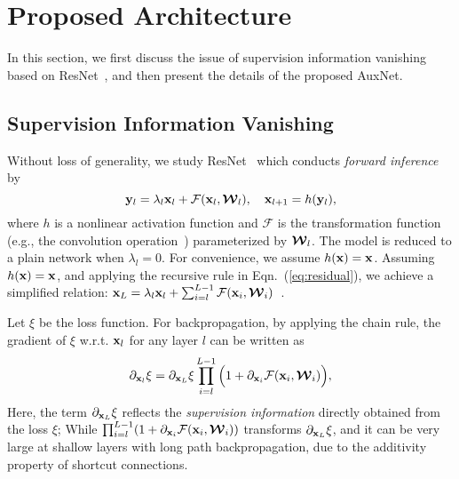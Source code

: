 \documentclass[10pt,onecolumn,letterpaper]{article}
\def\mF{{\mathcal F}}
\def\bmW{\mbox{\boldmath${\mathcal W}$}}
\def\bx{{\bf x}}
\def\by{{\bf y}}
\def\SexyName{AuxNet\xspace}
\begin{document}
\section{Proposed Architecture}\label{sec:model_structure}
In this section, we first discuss the issue of supervision information vanishing based on ResNet~\cite{he2015deep}, and then present the details of the proposed \SexyName.
\subsection{Supervision Information Vanishing}\label{sec:SIV}
Without loss of generality, we study ResNet~\cite{he2015deep} which
conducts \emph{forward inference} by
 \begin{equation}\label{eq:residual}
 \by_{l} = \lambda_l {\bx_l} + \mF({\bx_l},{{\bmW}_l}), ~~~\bx_{l + 1} = h(\by_{l}),
 \end{equation}
where $h$ is a nonlinear activation function and $\mF$ is the transformation function (e.g.,  the convolution operation~\cite{romero2014fitnets})
parameterized by $\bmW_l$. The model is reduced to a plain network when $\lambda_l=0$. For convenience, we assume $h(\bx) = \bx$.
Assuming $h(\bx) = \bx$, and applying the recursive rule in Eqn.~(\ref{eq:residual}), we achieve a simplified relation:
${\bx_L} = \lambda_l{\bx_l} + \sum_{i = l}^{L - 1} { \mF(\bx_i,\bmW_i) }$~\cite{he2016identity}.


Let $\xi$ be the loss function. For backpropagation, by applying the chain rule,  the gradient of $\xi$ w.r.t. $\bx_l$  for any layer $l$  can be written as
\begin{equation}\label{eq:gradient_resnet}
{{\partial_{\bx_l} \xi }} = {\partial_{\bx_{L}} \xi }  \prod\limits_{i = l}^{L - 1} \Big( {1 + \partial_{\bx_i}  {\mF({\bx_i},{{\bmW}_i})}} \Big),
\end{equation}
Here, the term ${\partial_{\bx_{L}} \xi }$ reflects the {\em supervision information} directly obtained from the loss $\xi$; While $\prod_{i = l}^{L - 1} ( {1 + \partial_{\bx_i}  {\mF({\bx_i},{{\bmW}_i})}} )$ transforms $\partial_{\bx_{L}} \xi$, and it can be very large at shallow layers with long path backpropagation, due to the additivity property of shortcut connections.
\end{document}
